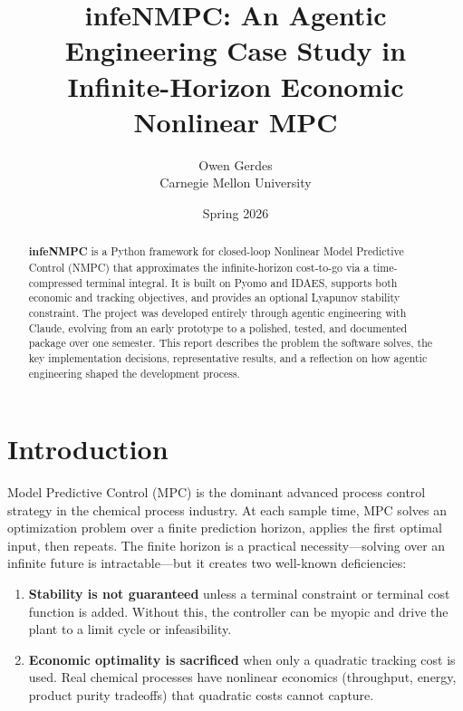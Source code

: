 \documentclass[11pt,letterpaper]{article}
\title{\textbf{infeNMPC: An Agentic Engineering Case Study in\\
Infinite-Horizon Economic Nonlinear MPC}}
\author{Owen Gerdes\\
Carnegie Mellon University}
\date{Spring 2026}
\begin{document}
\maketitle

\begin{abstract}
\noindent
\textbf{infeNMPC} is a Python framework for closed-loop Nonlinear Model Predictive Control (NMPC) that approximates the infinite-horizon cost-to-go via a time-compressed terminal integral. It is built on Pyomo and IDAES, supports both economic and tracking objectives, and provides an optional Lyapunov stability constraint. The project was developed entirely through agentic engineering with Claude, evolving from an early prototype to a polished, tested, and documented package over one semester. This report describes the problem the software solves, the key implementation decisions, representative results, and a reflection on how agentic engineering shaped the development process.
\end{abstract}

\tableofcontents
\newpage

\section{Introduction}

Model Predictive Control (MPC) is the dominant advanced process control strategy in the chemical process industry. At each sample time, MPC solves an optimization problem over a finite prediction horizon, applies the first optimal input, then repeats. The finite horizon is a practical necessity---solving over an infinite future is intractable---but it creates two well-known deficiencies:

\begin{enumerate}[leftmargin=2em]
  \item \textbf{Stability is not guaranteed} unless a terminal constraint or terminal cost function is added. Without this, the controller can be myopic and drive the plant to a limit cycle or infeasibility.
  \item \textbf{Economic optimality is sacrificed} when only a quadratic tracking cost is used. Real chemical processes have nonlinear economics (throughput, energy, product purity tradeoffs) that quadratic costs cannot capture.
\end{enumerate}
\end{document}
